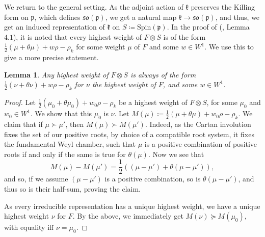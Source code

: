 \documentclass[11pt,reqno]{amsart}
\numberwithin{equation}{section}
\newtheorem{lem}[thm]{Lemma}
\theoremstyle{definition}
\theoremstyle{remark}
\newcommand{\mf}[1]{\mathfrak{#1}}
\begin{document}
\noindent We return to the general setting. As the adjoint action of $\mf{k}$ preserves the Killing form on $\mf{p}$, which defines $\mf{so}(\mf{p})$, we get a natural map $\mf{k}\to\mf{so}(\mf{p})$, and thus, we get an induced representation of $\mf{k}$ on $S\coloneqq\text{Spin}(\mf{p})$. In the proof of (\cite{BV}, Lemma $4.1$), it is noted that every highest weight of $F\otimes S$ is of the form $\frac12(\mu+\theta\mu)+w\rho-\rho_k$ for some weight $\mu$ of $F$ and some $w\in W^1$. We use this to give a more precise statement.

\begin{lem}\label{weight}
    Any highest weight of $F\otimes S$ is always of the form $\frac12(\nu+\theta\nu)+w\rho-\rho_k$ for $\nu$ the \textit{highest} weight of $F$, and some $w\in W^1$.
\end{lem}

\begin{proof}
    Let $\frac12(\mu_0+\theta\mu_0)+w_0\rho-\rho_k$ be a highest weight of $F\otimes S$, for some $\mu_0$ and $w_0\in W^1$. We show that this $\mu_0$ is $\nu$. Let $M(\mu)\coloneqq \frac12(\mu+\theta\mu)+w_0\rho-\rho_k$. We claim that if $\mu\succ \mu'$, then $M(\mu)\succ M(\mu')$. Indeed, as the Cartan involution fixes the set of our positive roots, by choice of a compatible root system, it fixes the fundamental Weyl chamber, such that $\mu$ is a positive combination of positive roots if and only if the same is true for $\theta(\mu)$. Now we see that
    $$M(\mu)-M(\mu') = \frac12((\mu-\mu')+\theta(\mu-\mu')),$$
    and so, if we assume $(\mu-\mu')$ is a positive combination, so is $\theta(\mu-\mu')$, and thus so is their half-sum, proving the claim. 
    
    As every irreducible representation has a unique highest weight, we have a unique highest weight $\nu$ for $F$. By the above, we immediately get $M(\nu)\succeq M(\mu_0)$, with equality iff $\nu=\mu_0$.
\end{proof}
\end{document}
